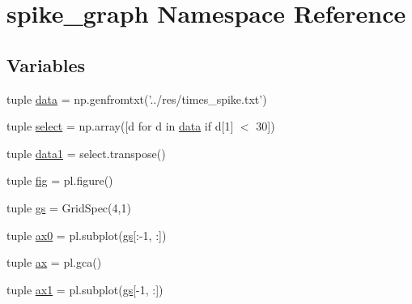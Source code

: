\hypertarget{namespacespike__graph}{\section{spike\-\_\-graph Namespace Reference}
\label{namespacespike__graph}
}
\subsection*{Variables}
\begin{DoxyCompactItemize}
\item 
tuple \hyperlink{namespacespike__graph_a6f9be9e759aaafa3013bdc8d11a50915}{data} = np.\-genfromtxt('../res/times\-\_\-spike.\-txt')
\item 
tuple \hyperlink{namespacespike__graph_a0f1ea338f80e69a3131a5e1ebcda2fb7}{select} = np.\-array(\mbox{[}d for d in \hyperlink{namespacespike__graph_a6f9be9e759aaafa3013bdc8d11a50915}{data} if d\mbox{[}1\mbox{]} $<$ 30\mbox{]})
\item 
tuple \hyperlink{namespacespike__graph_a42e120d3042c368a5bc01bb0bec93035}{data1} = select.\-transpose()
\item 
tuple \hyperlink{namespacespike__graph_a6f0be72cbf414e636c92c1ed77515c1d}{fig} = pl.\-figure()
\item 
tuple \hyperlink{namespacespike__graph_ac04ae7194fd2b19e10cbf2db5aa59152}{gs} = Grid\-Spec(4,1)
\item 
tuple \hyperlink{namespacespike__graph_a69bc8269ca3daf787ef3712ac7661871}{ax0} = pl.\-subplot(\hyperlink{namespacespike__graph_ac04ae7194fd2b19e10cbf2db5aa59152}{gs}\mbox{[}\-:-\/1, \-:\mbox{]})
\item 
tuple \hyperlink{namespacespike__graph_a92f69e9db1c7f4f329d5915727b031e0}{ax} = pl.\-gca()
\item 
tuple \hyperlink{namespacespike__graph_ada8edbab071f17401b2c0b018f027734}{ax1} = pl.\-subplot(\hyperlink{namespacespike__graph_ac04ae7194fd2b19e10cbf2db5aa59152}{gs}\mbox{[}-\/1, \-:\mbox{]})
\end{DoxyCompactItemize}


